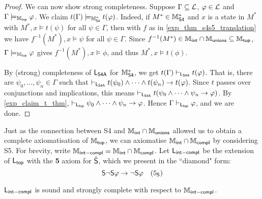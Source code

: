 \begin{proof}
We can now show strong completeness. Suppose $\Gamma \subseteq \cL$, $\phi \in
\cL$ and $\Gamma \models_{\Mtop} \phi$. We claim $t(\Gamma) \models_{\Msfour}
t(\phi)$. Indeed, if $M^* \in \Msfour$ and $x$ is a state in $M^*$ with $M^*, x
\models t(\psi)$ for all $\psi \in \Gamma$, then with $f$ as in
\cref{exp_thm_s4s5_translation} we have $f^{-1}(M^*), x \models \psi$ for all $\psi
\in \Gamma$. Since $f^{-1}(M^*) \in \Mint \cap \Munions \subseteq \Mtop$,
$\Gamma \models_{\Mtop} \phi$ gives $f^{-1}(M^*), x \models \phi$, and thus
$M^*, x \models t(\phi)$.

By (strong) completeness of $\sLsfoura$ for $\Msfour$, we get $t(\Gamma)
\entails_{\sLsfoura} t(\phi)$. That is, there are $\psi_0, \ldots, \psi_n \in
\Gamma$ such that $\entails_{\sLsfoura} t(\psi_0) \land \cdots \land t(\psi_n)
\limplies t(\phi)$. Since $t$ passes over conjunctions and implications, this
means $\entails_{\sLsfoura} t(\psi_0 \land \cdots \land \psi_n \limplies
\phi)$. By \cref{exp_claim_t_thm}, $\entails_{\sLtop} \psi_0 \land \cdots \land
\psi_n \limplies \phi$. Hence $\Gamma \entails_{\sLtop} \phi$, and we are done.
\end{proof}

Just as the connection between S4 and $\Mint \cap \Munions$ allowed us
to obtain a complete axiomatisation of $\Mtop$, we can axiomatise $\Mint \cap
\Mcompl$ by considering S5. For brevity, write $\Mintcompl = \Mint
\cap \Mcompl$. Let $\sLintcompl$ be the extension of $\sLtop$
with the \textbf{5} axiom for $\hat\S$, which we present in the ``diamond"
form:
\[
    \S\neg\S\phi \limplies \neg\S\phi
    \quad
    \fivesoundness
\]

\begin{theorem}
\label{exp_thm_mintcompl_axiomatisation}
$\sLintcompl$ is sound and strongly complete with respect to
$\Mintcompl$.
\end{theorem}

